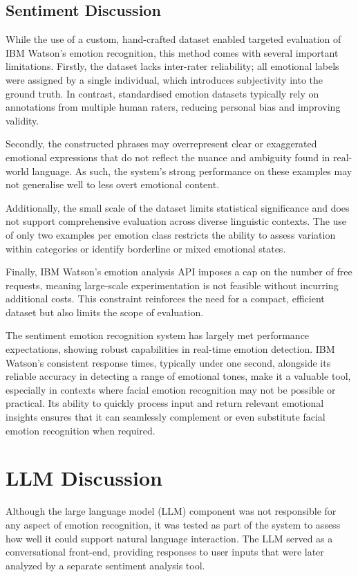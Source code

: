\subsection{Sentiment Discussion}
While the use of a custom, hand-crafted dataset enabled targeted evaluation of IBM Watson's emotion recognition, this method comes with several important limitations. Firstly, the dataset lacks inter-rater reliability; all emotional labels were assigned by a single individual, which introduces subjectivity into the ground truth. In contrast, standardised emotion datasets typically rely on annotations from multiple human raters, reducing personal bias and improving validity.

Secondly, the constructed phrases may overrepresent clear or exaggerated emotional expressions that do not reflect the nuance and ambiguity found in real-world language. As such, the system's strong performance on these examples may not generalise well to less overt emotional content.

Additionally, the small scale of the dataset limits statistical significance and does not support comprehensive evaluation across diverse linguistic contexts. The use of only two examples per emotion class restricts the ability to assess variation within categories or identify borderline or mixed emotional states.

Finally, IBM Watson's emotion analysis API imposes a cap on the number of free requests, meaning large-scale experimentation is not feasible without incurring additional costs. This constraint reinforces the need for a compact, efficient dataset but also limits the scope of evaluation.

The sentiment emotion recognition system has largely met performance expectations, showing robust capabilities in real-time emotion detection. IBM Watson's consistent response times, typically under one second, alongside its reliable accuracy in detecting a range of emotional tones, make it a valuable tool, especially in contexts where facial emotion recognition may not be possible or practical. Its ability to quickly process input and return relevant emotional insights ensures that it can seamlessly complement or even substitute facial emotion recognition when required.

\section{LLM Discussion}

Although the large language model (LLM) component was not responsible for any aspect of emotion recognition, it was tested as part of the system to assess how well it could support natural language interaction. The LLM served as a conversational front-end, providing responses to user inputs that were later analyzed by a separate sentiment analysis tool.

